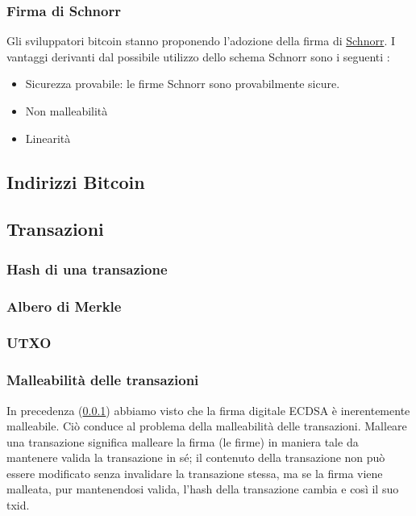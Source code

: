 \documentclass{article}
\begin{document}



\subsubsection{Firma di Schnorr} \label{Schnorr}

Gli sviluppatori bitcoin stanno proponendo l'adozione della firma di \href{https://en.bitcoin.it/wiki/Schnorr}{Schnorr}.
I vantaggi derivanti dal possibile utilizzo dello schema Schnorr sono i seguenti \cite{BipSchnorr}:

\begin{itemize}
    \item Sicurezza provabile: le firme Schnorr sono provabilmente sicure.
    \item Non malleabilità
    \item Linearità
\end{itemize}

\newpage
\subsection{Indirizzi Bitcoin}

\newpage
\subsection{Transazioni}
\subsubsection{Hash di una transazione}
\subsubsection{Albero di Merkle}
\subsubsection{UTXO}
\subsubsection{Malleabilità delle transazioni}
In precedenza (\ref{Schnorr}) abbiamo visto che la firma digitale ECDSA è inerentemente malleabile.
Ciò conduce al problema della malleabilità delle transazioni.
Malleare una transazione significa malleare la firma (le firme) in maniera tale da mantenere valida la transazione in sé;
il contenuto della transazione non può essere modificato senza invalidare la transazione stessa, ma se la firma viene malleata, 
pur mantenendosi valida, l'hash della transazione cambia e così il suo txid.
\end{document}
